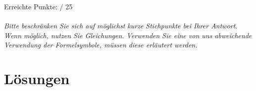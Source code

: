\documentclass[12pt,a4paper]{article}
\begin{document}
Erreichte Punkte:  \qquad / 25
\\ \\
\textit{Bitte beschränken Sie sich auf möglichst kurze Stichpunkte bei Ihrer Antwort. Wenn möglich, nutzen Sie Gleichungen. Verwenden Sie eine von uns abweichende Verwendung der Formelsymbole, müssen diese erläutert werden.}

\vspace{1cm}




\newpage

\section*{Lösungen}


\end{document}
